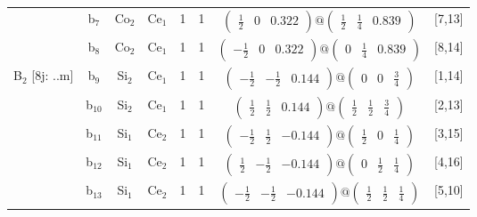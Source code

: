 \documentclass[fleqn,10pt,landscape]{article}
\begin{document}
\begin{itemize}
\begin{center}
\begin{longtable}{cc|cc|c|c|c|l}
& b$_{7}$ & Co$_{2}$ & Ce$_{1}$ & 1 & 1 & $\begin{pmatrix} \frac{1}{2} & 0 & 0.322 \end{pmatrix}@\begin{pmatrix} \frac{1}{2} & \frac{1}{4} & 0.839 \end{pmatrix}$ & [7,13] \\
& b$_{8}$ & Co$_{2}$ & Ce$_{1}$ & 1 & 1 & $\begin{pmatrix} - \frac{1}{2} & 0 & 0.322 \end{pmatrix}@\begin{pmatrix} 0 & \frac{1}{4} & 0.839 \end{pmatrix}$ & [8,14] \\ \hline
B$_{2}$ [8j: ..m] & b$_{9}$ & Si$_{2}$ & Ce$_{1}$ & 1 & 1 & $\begin{pmatrix} - \frac{1}{2} & - \frac{1}{2} & 0.144 \end{pmatrix}@\begin{pmatrix} 0 & 0 & \frac{3}{4} \end{pmatrix}$ & [1,14] \\
& b$_{10}$ & Si$_{2}$ & Ce$_{1}$ & 1 & 1 & $\begin{pmatrix} \frac{1}{2} & \frac{1}{2} & 0.144 \end{pmatrix}@\begin{pmatrix} \frac{1}{2} & \frac{1}{2} & \frac{3}{4} \end{pmatrix}$ & [2,13] \\
& b$_{11}$ & Si$_{1}$ & Ce$_{2}$ & 1 & 1 & $\begin{pmatrix} - \frac{1}{2} & \frac{1}{2} & -0.144 \end{pmatrix}@\begin{pmatrix} \frac{1}{2} & 0 & \frac{1}{4} \end{pmatrix}$ & [3,15] \\
& b$_{12}$ & Si$_{1}$ & Ce$_{2}$ & 1 & 1 & $\begin{pmatrix} \frac{1}{2} & - \frac{1}{2} & -0.144 \end{pmatrix}@\begin{pmatrix} 0 & \frac{1}{2} & \frac{1}{4} \end{pmatrix}$ & [4,16] \\
& b$_{13}$ & Si$_{1}$ & Ce$_{2}$ & 1 & 1 & $\begin{pmatrix} - \frac{1}{2} & - \frac{1}{2} & -0.144 \end{pmatrix}@\begin{pmatrix} \frac{1}{2} & \frac{1}{2} & \frac{1}{4} \end{pmatrix}$ & [5,10] \\

\end{longtable}
\end{center}
\end{itemize}
\end{document}
